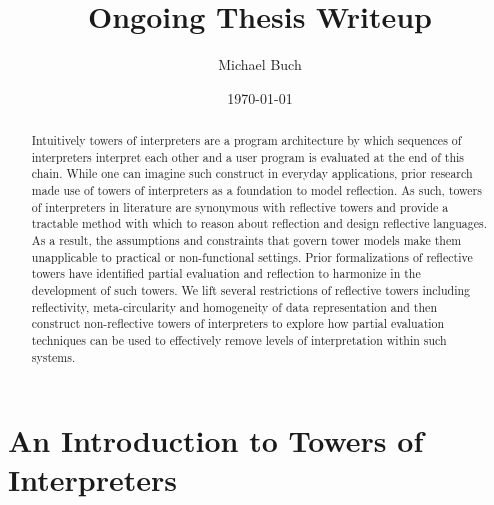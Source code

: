 \documentclass[fleqn]{article}
\title{Ongoing Thesis Writeup}
\author{Michael Buch}
\date{\today}
\theoremstyle{definition}
\begin{document}
\maketitle
\frenchspacing

\begin{abstract}
Intuitively towers of interpreters are a program architecture by which sequences of interpreters interpret each other and a user program is evaluated at the end of this chain. While one can imagine such
construct in everyday applications, prior research made use of towers of interpreters as a foundation to model reflection. As such, towers of interpreters in literature are synonymous with reflective towers and provide a tractable method with which to reason about reflection and design reflective languages. As a result, the assumptions and constraints that govern tower models make them unapplicable to practical or non-functional
settings. Prior formalizations of reflective towers have identified partial evaluation and reflection to harmonize in the development of such towers. We lift several restrictions of reflective towers including reflectivity, meta-circularity and homogeneity of data representation and then construct non-reflective towers
of interpreters to explore how partial evaluation techniques can be used to effectively remove levels of interpretation within such systems. %
\end{abstract}

\newcommand{\mslang}{$\lambda_{\uparrow\downarrow}$}
\newcommand{\mslangStar}{$\lambda_{\uparrow\downarrow}^*$}

\section{An Introduction to Towers of Interpreters}
\end{document}

